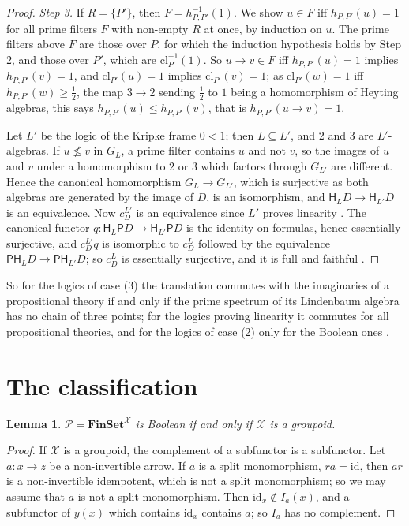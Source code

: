 \documentclass[11pt]{amsart}
\newtheorem{lem}[thm]{Lemma}
\theoremstyle{definition}
\newcommand{\Fin}{\mathbf{FinSet}}
\newcommand{\PP}{\mathsf P}
\newcommand{\HH}{\mathsf H}
\newcommand{\cX}{\mathcal X}
\newcommand{\cP}{\mathcal P}
\newcommand{\id}{\mathrm{id}}
\begin{document}
\begin{proof}
\emph{Step 3.} If $R=\{P'\}$, then $F=h_{P,P'}^{-1}(1)$. We show $u\in
F$ iff $h_{P,P'}(u)=1$ for all prime filters $F$ with non-empty $R$ at
once, by induction on $u$. The prime filters above $F$ are those over
$P$, for which the induction hypothesis holds by Step 2, and those
over $P'$, which are $\mathrm{cl}_{P'}^{-1}(1)$. So $u\to v\in F$ iff
$h_{P,P'}(u)=1$ implies $h_{P,P'}(v)=1$, and $\mathrm{cl}_{P'}(u)=1$
implies $\mathrm{cl}_{P'}(v)=1$; as $\mathrm{cl}_{P'}(w)=1$ iff
$h_{P,P'}(w)\ge\frac12$, the map $3\to2$ sending $\frac12$ to $1$
being a homomorphism of Heyting algebras, this says $h_{P,P'}(u)\le h_{P,P'}(v)$, that
is $h_{P,P'}(u\to v)=1$.

Let $L'$ be the logic of the Kripke frame $0<1$; then $L\subseteq L'$,
and $2$ and $3$ are $L'$-algebras. If $u\not\le v$ in $G_L$, a prime
filter contains $u$ and not $v$, so the images of $u$ and $v$ under a
homomorphism to $2$ or $3$ which factors through $G_{L'}$ are
different. Hence the canonical homomorphism $G_L\to G_{L'}$, which is
surjective as both algebras are generated by the image of $D$, is an
isomorphism, and $\HH_LD\to\HH_{L'}D$ is an equivalence. Now $c^{L'}_D$
is an equivalence since $L'$ proves linearity
\cite[Thm.~6.3]{Interm}. The canonical functor $q\colon\HH_L\PP D\to
\HH_{L'}\PP D$ is the identity on formulas, hence essentially
surjective, and $c^{L'}_Dq$ is isomorphic to $c^L_D$ followed by the
equivalence $\PP\HH_LD\to\PP\HH_{L'}D$; so $c^L_D$ is essentially
surjective, and it is full and faithful \cite[Lemma~2.2]{Interm}.
\end{proof}

So for the logics of case (3) the translation commutes with the
imaginaries of a propositional theory if and only if the prime
spectrum of its Lindenbaum algebra has no chain of three points; for
the logics proving linearity it commutes for all propositional
theories, and for the logics of case (2) only for the Boolean ones
\cite{Interm}.

\section{The classification}

\begin{lem}\label{lem:boolean}
$\cP=\Fin^{\cX}$ is Boolean if and only if $\cX$ is a groupoid.
\end{lem}
\begin{proof}
If $\cX$ is a groupoid, the complement of a subfunctor is a subfunctor.
Let $a\colon x\to z$ be a non-invertible arrow. If $a$ is a split
monomorphism, $ra=\id$, then $ar$ is a non-invertible idempotent,
which is not a split monomorphism; so we may assume that $a$ is not a
split monomorphism. Then $\id_x\notin I_a(x)$, and a subfunctor of
$y(x)$ which contains $\id_x$ contains $a$; so $I_a$ has no complement.
\end{proof}
\end{document}
